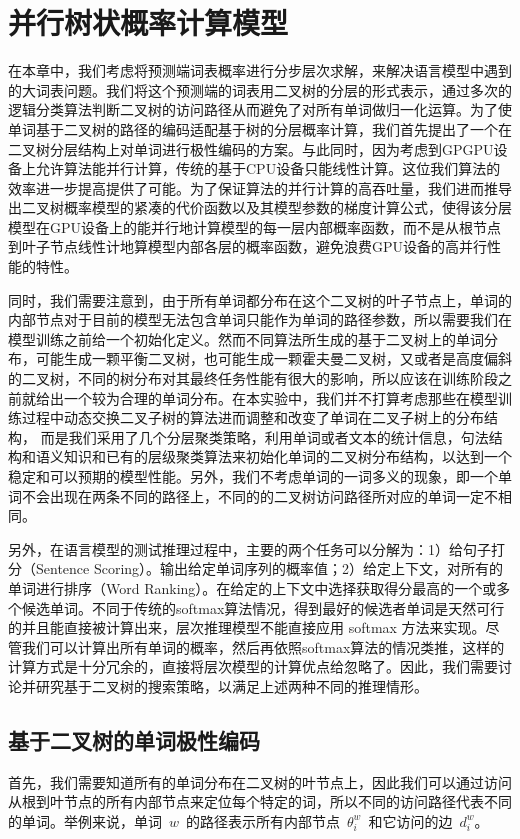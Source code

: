 \chapter{并行树状概率计算模型}
在本章中，我们考虑将预测端词表概率进行分步层次求解，来解决语言模型中遇到的大词表问题。我们将这个预测端的词表用二叉树的分层的形式表示，通过多次的逻辑分类算法判断二叉树的访问路径从而避免了对所有单词做归一化运算。为了使单词基于二叉树的路径的编码适配基于树的分层概率计算，我们首先提出了一个在二叉树分层结构上对单词进行极性编码的方案。与此同时，因为考虑到GPGPU设备上允许算法能并行计算，传统的基于CPU设备只能线性计算。这位我们算法的效率进一步提高提供了可能。为了保证算法的并行计算的高吞吐量，我们进而推导出二叉树概率模型的紧凑的代价函数以及其模型参数的梯度计算公式，使得该分层模型在GPU设备上的能并行地计算模型的每一层内部概率函数，而不是从根节点到叶子节点线性计地算模型内部各层的概率函数，避免浪费GPU设备的高并行性能的特性。

同时，我们需要注意到，由于所有单词都分布在这个二叉树的叶子节点上，单词的内部节点对于目前的模型无法包含单词只能作为单词的路径参数，所以需要我们在模型训练之前给一个初始化定义。然而不同算法所生成的基于二叉树上的单词分布，可能生成一颗平衡二叉树，也可能生成一颗霍夫曼二叉树，又或者是高度偏斜的二叉树，不同的树分布对其最终任务性能有很大的影响，所以应该在训练阶段之前就给出一个较为合理的单词分布。在本实验中，我们并不打算考虑那些在模型训练过程中动态交换二叉子树的算法进而调整和改变了单词在二叉子树上的分布结构， 而是我们采用了几个分层聚类策略，利用单词或者文本的统计信息，句法结构和语义知识和已有的层级聚类算法来初始化单词的二叉树分布结构，以达到一个稳定和可以预期的模型性能。另外，我们不考虑单词的一词多义的现象，即一个单词不会出现在两条不同的路径上，不同的的二叉树访问路径所对应的单词一定不相同。

另外，在语言模型的测试推理过程中，主要的两个任务可以分解为：1）给句子打分（Sentence Scoring）。输出给定单词序列的概率值；2）给定上下文，对所有的单词进行排序（Word Ranking）。在给定的上下文中选择获取得分最高的一个或多个候选单词。不同于传统的softmax算法情况，得到最好的候选者单词是天然可行的并且能直接被计算出来，层次推理模型不能直接应用 softmax 方法来实现。尽管我们可以计算出所有单词的概率，然后再依照softmax算法的情况类推，这样的计算方式是十分冗余的，直接将层次模型的计算优点给忽略了。因此，我们需要讨论并研究基于二叉树的搜索策略，以满足上述两种不同的推理情形。
\section{基于二叉树的单词极性编码}
首先，我们需要知道所有的单词分布在二叉树的叶节点上，因此我们可以通过访问从根到叶节点的所有内部节点来定位每个特定的词，所以不同的访问路径代表不同的单词。举例来说，单词~$w$~的路径表示所有内部节点~$\theta^w_i$~和它访问的边~$d^w_i$。

